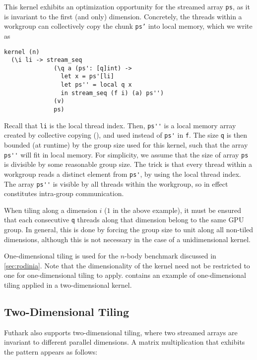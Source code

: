 This kernel exhibits an optimization opportunity for the streamed
array \lstinline{ps}, as it is invariant to the first (and only)
dimension.  Concretely, the threads within a workgroup can
collectively copy the chunk \texttt{ps'} into local memory, which we
write as
\begin{lstlisting}
kernel (n)
  (\i li -> stream_seq
              (\q a (ps': [q]int) ->
                let x = ps'[li]
                let ps'' = local q x
                in stream_seq (f i) (a) ps'')
              (v)
              ps)
\end{lstlisting}
\noindent Recall that \texttt{li} is the local thread index.  Then,
\lstinline{ps''} is a local memory array created by collective copying
(), and used instead of \lstinline{ps'} in
\lstinline{f}. The size \lstinline{q} is then bounded (at runtime) by
the group size used for this kernel, such that the array
\lstinline{ps''} will fit in local memory.  For simplicity, we assume
that the size of array \texttt{ps} is divisible by some reasonable
group size.  The trick is that every thread within a workgroup reads a
distinct element from \lstinline{ps'}, by using the local thread index.
The array \lstinline{ps''} is visible by all threads within the
workgroup, so  in effect constitutes intra-group
communication.

When tiling along a dimension $i$ ($1$ in the above example), it must
be ensured that each consecutive \lstinline{q} threads along that
dimension belong to the same GPU group.  In general, this is done by
forcing the group size to unit along all non-tiled dimensions,
although this is not necessary in the case of a unidimensional kernel.

One-dimensional tiling is used for the $n$-body benchmark discussed in
\cref{sec:rodinia}.  Note that the dimensionality of the kernel need
not be restricted to one for one-dimensional tiling to apply.
 contains an example of one-dimensional tiling
applied in a two-dimensional kernel.

\subsection{Two-Dimensional Tiling}
\label{sec:two-dimensional-tiling}

Futhark also supports two-dimensional tiling, where two streamed
arrays are invariant to different parallel dimensions.  A matrix
multiplication that exhibits the pattern appears as follows:

